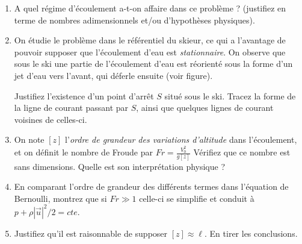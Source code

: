 \begin{enumerate}

\item A quel régime d'écoulement a-t-on affaire dans ce problème ?
(justifiez en terme de nombres adimensionnels et/ou d'hypothèses physiques).



\item On étudie le problème dans le référentiel du skieur, ce qui a l'avantage de pouvoir supposer que l'écoulement d'eau est {\em stationnaire}.
On observe que sous le ski une partie de l'écoulement d'eau est réorienté sous la forme d'un jet d'eau vers l'avant, qui déferle ensuite (voir figure).

Justifiez l'existence d'un point d'arrêt $S$ situé sous le ski. Tracez la forme de la ligne de courant passant par  $S$, ainsi que quelques lignes de courant voisines de celles-ci.


\item On note $[z]$ l'{\em ordre de grandeur des variations d'altitude} dans l'écoulement, et on définit le nombre de Froude par $Fr = \frac{V_0^2}{g [z]} $ Vérifiez que ce nombre est sans dimensions. Quelle est son interprétation physique ?


\item En comparant l'ordre de grandeur des différents termes dans l'équation de Bernoulli, montrez que si $Fr \gg 1$ celle-ci se simplifie et conduit à $p+\rho |\vec{u}|^2/2 = cte$. 


\item Justifiez qu'il est raisonnable de supposer $[z] \approx \ell$. En tirer les conclusions. 


\end{enumerate}
